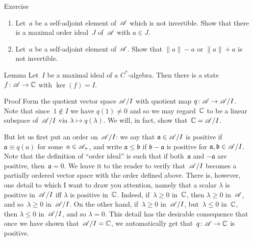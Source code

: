 \documentclass[main]{subfiles}
\begin{document}
\begin{parsec}
\begin{point}{Exercise}
\begin{enumerate}
\item
Let~$a$ be a self-adjoint element of~$\mathscr{A}$ which
is not invertible.
Show that there is a maximal order ideal~$J$
of~$\mathscr{A}$
with $a\in J$.

\item
Let~$a$ be a self-adjoint element of~$\mathscr{A}$.
Show that  $\|a\|-a$
or $\|a\|+a$ is not invertible.
\end{enumerate}
\end{point}
\begin{point}{Lemma}%
Let~$I$ be a maximal ideal of a $C^*$-algebra.
Then there is a state $f\colon \mathscr{A}\to \mathbb{C}$
with $\ker(f)=I$.
\begin{point}{Proof}%
Form the quotient vector space $\mathscr{A}/I$
with quotient map $q\colon \mathscr{A}\to \mathscr{A}/I$.
Note that since~$1\notin I$
we have $q(1)\neq 0$
and so we may regard~$\mathbb{C}$ 
to be a linear subspace of~$\mathscr{A}/I$
via $\lambda\mapsto q(\lambda)$.
We will, in fact, show that~$\mathbb{C}=\mathscr{A}/I$.

But let us first put an order on~$\mathscr{A}/I$:
we say that $\mathfrak{a}\in \mathscr{A}/I$ is positive
if $\mathfrak{a}\equiv q(a)$ for some~$a\in\mathscr{A}_{+}$,
and write $\mathfrak{a}\leq \mathfrak{b}$ 
if $\mathfrak{b}-\mathfrak{a}$ is positive
for $\mathfrak{a},\mathfrak{b}\in\mathscr{A}/I$.
Note that the definition of ``order ideal'' is such
that if both~$\mathfrak{a}$ and $-\mathfrak{a}$ are positive,
then~$\mathfrak{a}=0$.
We leave it to the reader to verify 
that~$\mathscr{A}/I$ becomes a partially ordered vector space
with the order defined above.
There is, however,
one detail to which I want to draw you attention,
namely that a scalar $\lambda$ is positive in~$\mathscr{A}/I$
iff $\lambda$ is positive in~$\mathbb{C}$.
Indeed, if~$\lambda\geq 0$ in~$\mathbb{C}$,
then $\lambda\geq 0$ in~$\mathscr{A}$, and so~$\lambda \geq 0$ in~$\mathscr{A}/I$.
On the other hand,
if~$\lambda\geq 0$ in~$\mathscr{A}/I$, but~$\lambda\leq 0$ in~$\mathbb{C}$,
then $\lambda\leq 0$ in~$\mathscr{A}/I$,
and so $\lambda=0$.
This detail
has the desirable consequence
that once we have shown that~$\mathscr{A}/I=\mathbb{C}$,
we automatically get that~$q\colon \mathscr{A}\to\mathbb{C}$ is positive.


\end{point}
\end{point}
\end{parsec}
\end{document}
